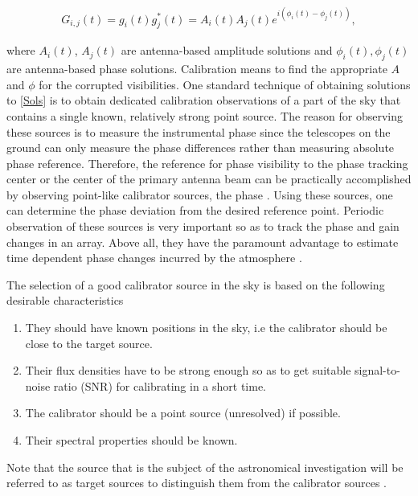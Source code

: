 \begin{align}
G_{i,j}(t)= g_i(t)g^*_j(t) = A_{i}(t)A_{j}(t) e ^{i\left(\phi_i(t)-\phi_j(t)\right)},
\label{Sols}
\end{align}

where  $A_{i}(t)$, $A_{j}(t)$ are antenna-based amplitude solutions and $\phi_i(t),\phi_j(t)$ are antenna-based phase solutions. Calibration means to find the appropriate $A$ and $\phi$ for the corrupted visibilities. One standard technique of obtaining solutions to \ref{Sols} is to obtain dedicated calibration observations of a part of the sky that contains a single known, relatively strong point source. The reason for observing these sources is to measure the instrumental phase since the telescopes on the ground can only measure the phase differences rather than measuring absolute phase reference. Therefore, the reference for phase visibility to the phase tracking center or the center of the primary antenna beam can be practically accomplished by observing point-like calibrator sources, the phase . Using these sources, one can determine the phase deviation from the desired reference point. Periodic observation of these sources is very important so as to track the phase and gain changes in an array. Above all, they have the paramount advantage to estimate time dependent phase changes incurred by the atmosphere \citep{taylor1999synthesis}.

The selection of a good calibrator source in the sky is based on the following desirable characteristics \citep{thompson2001interferometry} 

\begin{enumerate}
\item They should have known positions in the sky, i.e the calibrator should be close to the target source. 
\item  Their flux densities have to be strong enough so as to get suitable signal-to-noise ratio (SNR) for calibrating in a short time.
 \item The calibrator should be a point source (unresolved) if possible. 
 \item Their spectral properties should be known.
 \end{enumerate}
 
 Note that the source that is the subject  of the astronomical investigation will be referred to as target sources to distinguish them from the calibrator sources \citep{thompson2001interferometry}.
 
